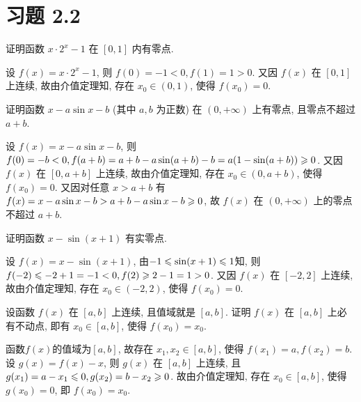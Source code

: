 \section{习题 2.2}

\begin{exercise}[2.2.1]
    证明函数 $x \cdot 2^x - 1$ 在 $[0,1]$ 内有零点.
\end{exercise}

\begin{solution}
    设 $f(x) = x \cdot 2^x - 1$, 则 $f(0) = -1 < 0, f(1) = 1 > 0$. 又因 $f(x)$ 在 $[0,1]$ 上连续, 故由介值定理知, 存在 $x_0 \in (0,1)$, 使得 $f(x_0) = 0$.
\end{solution}

\begin{exercise}[2.2.2]
    证明函数 $x - a\sin x - b$ (其中 $a,b$ 为正数) 在 $(0, +\infty)$ 上有零点, 且零点不超过 $a+b$.
\end{exercise}

\begin{solution}
    设 $f(x) = x - a\sin x - b$, 则 $f(0) = -b < 0, f(a+b) = a + b - a\sin(a+b) - b = a(1-\sin(a+b)) \geqslant 0$. 又因 $f(x)$ 在 $[0, a+b]$ 上连续, 故由介值定理知, 存在 $x_0 \in (0, a+b)$, 使得 $f(x_0) = 0$. 又因对任意 $x > a+b$ 有 $f(x) = x - a\sin x - b > a + b - a \sin x - b \geqslant 0$, 故 $f(x)$ 在 $(0, +\infty)$ 上的零点不超过 $a+b$.
\end{solution}

\begin{exercise}[2.2.3]
    证明函数 $x - \sin(x+1)$ 有实零点.
\end{exercise}

\begin{solution}
    设 $f(x) = x - \sin(x+1)$, 由$ -1 \leqslant \sin(x+1) \leqslant 1$知,
    则 $f(-2) \leqslant -2 + 1 = -1 < 0, f(2) \geqslant 2 - 1 = 1 > 0$. 又因 $f(x)$ 在 $[-2,2]$ 上连续, 故由介值定理知, 存在 $x_0 \in (-2,2)$, 使得 $f(x_0) = 0$.
\end{solution}

\begin{exercise}[2.2.4]
    设函数 $f(x)$ 在 $[a,b]$ 上连续, 且值域就是 $[a,b]$. 证明 $f(x)$ 在 $[a,b]$ 上必有不动点, 即有 $x_0 \in [a,b]$, 使得 $f(x_0)=x_0$.
\end{exercise}

\begin{solution}
    函数$f(x)$的值域为$[a,b]$, 故存在 $x_1, x_2 \in [a,b]$, 使得 $f(x_1) = a, f(x_2) = b$. 设 $g(x) = f(x) - x$, 则 $g(x)$ 在 $[a,b]$ 上连续, 且 $g(x_1) = a - x_1 \leqslant 0, g(x_2) = b - x_2 \geqslant 0$. 故由介值定理知, 存在 $x_0 \in [a,b]$, 使得 $g(x_0) = 0$, 即 $f(x_0) = x_0$.
\end{solution}

